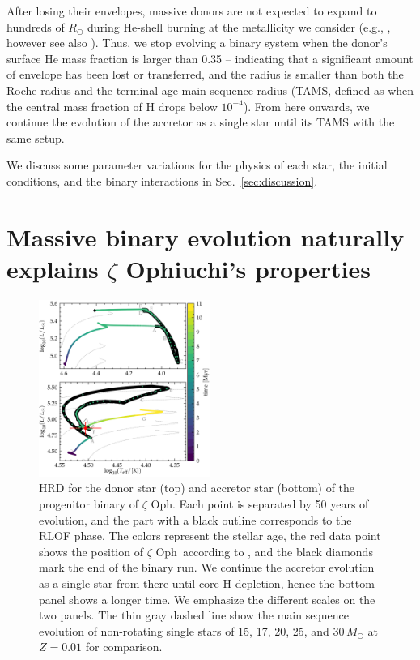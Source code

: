 \documentclass[twocolumn,twocolappendix,trackchanges]{aastex63}
\DeclareRobustCommand{\Secref}[1]{Sec.~\ref{#1}}
\newcommand{\zoph}{$\zeta$ Oph}
\begin{document}
After losing their envelopes, massive donors are not expected to
expand to hundreds of $R_\odot$ during He-shell burning at the
metallicity we consider (e.g., \citealt{laplace:20}, however see also
\citealt{gilkis:19}). Thus, we stop evolving a binary system when the
donor's surface He mass fraction is larger than 0.35 -- indicating
that a significant amount of envelope has been lost or transferred,
and the radius is smaller than both the Roche radius and the
terminal-age main sequence radius (TAMS, defined as when the central
mass fraction of H drops below $10^{-4}$). From here
onwards, %
we continue the evolution of the accretor as a single star until its TAMS
with the same setup.

We discuss some parameter variations for the physics of each star, the
initial conditions, and the binary interactions in \Secref{sec:discussion}.

\section{Massive binary evolution naturally explains $\zeta$
  Ophiuchi's properties}
\label{sec:best_model}

\begin{figure}[tp]
  \includegraphics[width=0.5\textwidth]{HRD_both}
  \caption{HRD for the donor star (top) and accretor star (bottom) of
    the progenitor binary of \zoph. Each point is separated by 50
    years of evolution, and the part with a black outline corresponds
    to the RLOF phase. The colors represent the stellar age, the red
    data point shows the position of \zoph\ according to
    , and the
    black diamonds mark the end of the binary run. We
    continue the accretor evolution as a single star from there until
    core H depletion, hence the bottom panel shows a longer time. We
    emphasize the different scales on the two panels. The thin gray
    dashed line show the main sequence evolution of non-rotating
    single stars of 15, 17, 20, 25, and 30\,$M_\odot$ at $Z=0.01$ for
    comparison.}
  \label{fig:HRD_both}
\end{figure}
\end{document}
